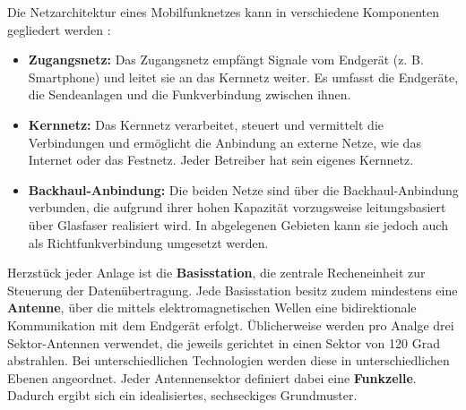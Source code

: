 \begin{German}
    Die Netzarchitektur eines Mobilfunknetzes kann in verschiedene Komponenten gegliedert werden \cite{behnkeGrundkursMobilfunkUnd2022,jiangCellularCommunicationNetworks2024}:

    \begin{itemize}
        \item \textbf{Zugangsnetz:} Das Zugangsnetz empfängt Signale vom Endgerät (z. B. Smartphone) und leitet sie an das Kernnetz weiter. Es umfasst die Endgeräte, die Sendeanlagen und die Funkverbindung zwischen ihnen. 
        \item \textbf{Kernnetz:} Das Kernnetz verarbeitet, steuert und vermittelt die Verbindungen und ermöglicht die Anbindung an externe Netze, wie das Internet oder das Festnetz. Jeder Betreiber hat sein eigenes Kernnetz.
        \item \textbf{Backhaul-Anbindung:} Die beiden Netze sind über die Backhaul-Anbindung verbunden, die aufgrund ihrer hohen Kapazität vorzugsweise leitungsbasiert über Glasfaser realisiert wird. In abgelegenen Gebieten kann sie jedoch auch als Richtfunkverbindung umgesetzt werden.
    \end{itemize}

    Herzstück jeder Anlage ist die \textbf{Basisstation}, die zentrale Recheneinheit zur Steuerung der Datenübertragung.  Jede Basisstation besitz zudem mindestens eine \textbf{Antenne}, über die mittels elektromagnetischen Wellen eine bidirektionale Kommunikation mit dem Endgerät erfolgt. Üblicherweise werden pro Analge drei Sektor-Antennen verwendet, die jeweils gerichtet in einen Sektor von 120 Grad abstrahlen. Bei unterschiedlichen Technologien werden diese in unterschiedlichen Ebenen angeordnet. Jeder Antennensektor definiert dabei eine \textbf{Funkzelle}. Dadurch ergibt sich ein idealisiertes, sechseckiges Grundmuster. \cite{behnkeGrundkursMobilfunkUnd2022}
\end{German}

